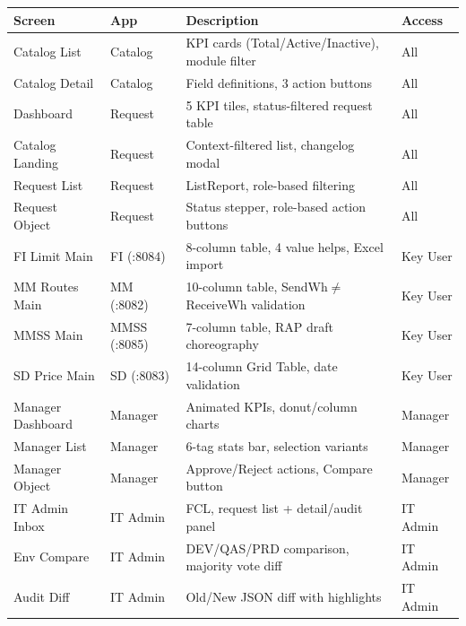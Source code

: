 \documentclass[12pt,a4paper]{report}
\begin{document}
\begin{longtable}{|l|l|p{5.5cm}|l|}
  \hline
  \rowcolor{tableheadpeach}
  \textbf{Screen} & \textbf{App} & \textbf{Description} & \textbf{Access} \\ \hline
  \endhead
  \hline
  \endfoot
  Catalog List     & Catalog    & KPI cards (Total/Active/Inactive), module filter         & All \\ \hline
  Catalog Detail   & Catalog    & Field definitions, 3 action buttons                      & All \\ \hline
  Dashboard        & Request    & 5 KPI tiles, status-filtered request table                & All \\ \hline
  Catalog Landing  & Request    & Context-filtered list, changelog modal                    & All \\ \hline
  Request List     & Request    & ListReport, role-based filtering                         & All \\ \hline
  Request Object   & Request    & Status stepper, role-based action buttons                 & All \\ \hline
  FI Limit Main    & FI (:8084) & 8-column table, 4 value helps, Excel import              & Key User \\ \hline
  MM Routes Main   & MM (:8082) & 10-column table, SendWh$\neq$ReceiveWh validation        & Key User \\ \hline
  MMSS Main        & MMSS (:8085) & 7-column table, RAP draft choreography                 & Key User \\ \hline
  SD Price Main    & SD (:8083)   & 14-column Grid Table, date validation                  & Key User \\ \hline
  Manager Dashboard& Manager    & Animated KPIs, donut/column charts                       & Manager \\ \hline
  Manager List     & Manager    & 6-tag stats bar, selection variants                      & Manager \\ \hline
  Manager Object   & Manager    & Approve/Reject actions, Compare button                   & Manager \\ \hline
  IT Admin Inbox   & IT Admin   & FCL, request list + detail/audit panel                   & IT Admin \\ \hline
  Env Compare      & IT Admin   & DEV/QAS/PRD comparison, majority vote diff               & IT Admin \\ \hline
  Audit Diff       & IT Admin   & Old/New JSON diff with highlights                        & IT Admin \\ \hline
\end{longtable}
\end{document}
